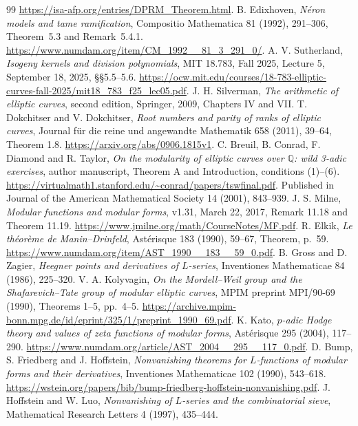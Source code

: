\documentclass[11pt]{article}
\theoremstyle{definition}
\theoremstyle{remark}
\newcommand{\Q}{\mathbb Q}
\begin{document}
\begin{thebibliography}{99}
\url{https://isa-afp.org/entries/DPRM_Theorem.html}.
B. Edixhoven, \emph{N\'eron models and tame ramification},
Compositio Mathematica 81 (1992), 291--306,
Theorem~5.3 and Remark~5.4.1.
\url{https://www.numdam.org/item/CM_1992__81_3_291_0/}.
 A. V. Sutherland,
\emph{Isogeny kernels and division polynomials}, MIT 18.783,
Fall 2025, Lecture 5, September 18, 2025, \S\S5.5--5.6.
\url{https://ocw.mit.edu/courses/18-783-elliptic-curves-fall-2025/mit18_783_f25_lec05.pdf}.
 J. H. Silverman, \emph{The arithmetic of elliptic
curves}, second edition, Springer, 2009, Chapters IV and VII.
 T. Dokchitser and V. Dokchitser, \emph{Root numbers and parity
of ranks of elliptic curves}, Journal f\"ur die reine und angewandte
Mathematik 658 (2011), 39--64, Theorem 1.8.
\url{https://arxiv.org/abs/0906.1815v1}.
 C. Breuil, B. Conrad, F. Diamond and R. Taylor,
\emph{On the modularity of elliptic curves over $\Q$: wild 3-adic exercises},
author manuscript, Theorem A and Introduction, conditions (1)--(6).
\url{https://virtualmath1.stanford.edu/~conrad/papers/tswfinal.pdf}.
Published in Journal of the American Mathematical Society 14 (2001), 843--939.
 J. S. Milne, \emph{Modular functions and modular forms},
v1.31, March 22, 2017, Remark 11.18 and Theorem 11.19.
\url{https://www.jmilne.org/math/CourseNotes/MF.pdf}.
 R. Elkik, \emph{Le th\'eor\`eme de Manin--Drinfeld},
Ast\'erisque 183 (1990), 59--67, Theorem, p.~59.
\url{https://www.numdam.org/item/AST_1990__183__59_0.pdf}.
 B. Gross and D. Zagier, \emph{Heegner points and derivatives
of $L$-series}, Inventiones Mathematicae 84 (1986), 225--320.
 V. A. Kolyvagin,
\emph{On the Mordell--Weil group and the Shafarevich--Tate group
of modular elliptic curves}, MPIM preprint MPI/90-69 (1990),
Theorems 1--5, pp.~4--5.
\url{https://archive.mpim-bonn.mpg.de/id/eprint/325/1/preprint_1990_69.pdf}.
 K. Kato, \emph{$p$-adic Hodge theory and values of zeta
functions of modular forms}, Ast\'erisque 295 (2004), 117--290.
\url{https://www.numdam.org/article/AST_2004__295__117_0.pdf}.
 D. Bump, S. Friedberg and J. Hoffstein,
\emph{Nonvanishing theorems for $L$-functions of modular forms and their
derivatives}, Inventiones Mathematicae 102 (1990), 543--618.
\url{https://wstein.org/papers/bib/bump-friedberg-hoffstein-nonvanishing.pdf}.
 J. Hoffstein and W. Luo, \emph{Nonvanishing of $L$-series and
the combinatorial sieve}, Mathematical Research Letters 4 (1997), 435--444.

\end{thebibliography}
\end{document}
